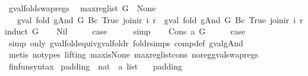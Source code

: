 \begin{isabellebody}
\ gval{\isacharunderscore}fold{\isacharunderscore}swap{\isacharunderscore}regs{\isacharcolon}\isanewline
\ \ {\isachardoublequoteopen}max{\isacharunderscore}reg{\isacharunderscore}list\ G\ {\isacharequal}\ None\ {\isasymLongrightarrow}\isanewline
\ \ \ gval\ {\isacharparenleft}fold\ gAnd\ G\ {\isacharparenleft}Bc\ True{\isacharparenright}{\isacharparenright}\ {\isacharparenleft}join{\isacharunderscore}ir\ i\ r{\isacharparenright}\ {\isacharequal}\ gval\ {\isacharparenleft}fold\ gAnd\ G\ {\isacharparenleft}Bc\ True{\isacharparenright}{\isacharparenright}\ {\isacharparenleft}join{\isacharunderscore}ir\ i\ r{\isacharprime}{\isacharparenright}{\isachardoublequoteclose}\isanewline
%
\isadelimproof
%
\endisadelimproof
%
\isatagproof
{}\isamarkupfalse%
{\isacharparenleft}induct\ G{\isacharparenright}\isanewline
\ \ \isamarkupfalse%
\ Nil\isanewline
\ \ \isamarkupfalse%
\ \isamarkupfalse%
\ {\isacharquery}case\isanewline
\ \ \ \ \isamarkupfalse%
\ simp\isanewline
{}\isamarkupfalse%
\isanewline
\ \ \isamarkupfalse%
\ {\isacharparenleft}Cons\ a\ G{\isacharparenright}\isanewline
\ \ \isamarkupfalse%
\ \isamarkupfalse%
\ {\isacharquery}case\isanewline
\ \ \ \ \isamarkupfalse%
\ {\isacharparenleft}simp\ only{\isacharcolon}\ gval{\isacharunderscore}fold{\isacharunderscore}equiv{\isacharunderscore}gval{\isacharunderscore}foldr\ foldr{\isachardot}simps\ comp{\isacharunderscore}def\ gval{\isacharunderscore}gAnd{\isacharparenright}\isanewline
\ \ \ \ \isamarkupfalse%
\ {\isacharparenleft}metis\ {\isacharparenleft}no{\isacharunderscore}types{\isacharcomma}\ lifting{\isacharparenright}\ max{\isacharunderscore}is{\isacharunderscore}None\ max{\isacharunderscore}reg{\isacharunderscore}list{\isacharunderscore}cons\ no{\isacharunderscore}reg{\isacharunderscore}gval{\isacharunderscore}swap{\isacharunderscore}regs{\isacharparenright}\isanewline
{}\isamarkupfalse%
%
\endisatagproof
{\isafoldproof}%
%
\isadelimproof
\isanewline
%
\endisadelimproof
\isanewline
{}\isamarkupfalse%
\ finfun{\isacharunderscore}syntax\isanewline
\isanewline
{}\isamarkupfalse%
\ padding\ {\isacharcolon}{\isacharcolon}\ {\isachardoublequoteopen}nat\ {\isasymRightarrow}\ {\isacharprime}a\ list{\isachardoublequoteclose}\ \isanewline
\ \ {\isachardoublequoteopen}padding\ {}\ {\isacharequal}\ {\isacharbrackleft}{\isacharbrackright}{\isachardoublequoteclose}\ {\isacharbar}\isanewline

\end{isabellebody}
